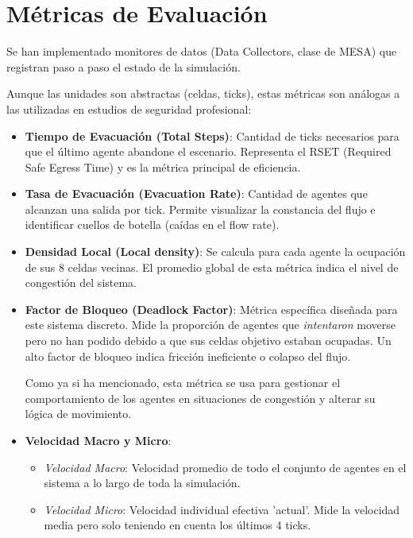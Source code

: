 \documentclass[11pt,spanish,listoffigures,listoftables]{tfgetsinf}
\begin{document}
\section{Métricas de Evaluación}

Se han implementado monitores de datos (Data Collectors, clase de MESA) que registran paso a paso el estado de la simulación. 

Aunque las unidades son abstractas (celdas, ticks), estas métricas son análogas a las utilizadas en estudios de seguridad profesional:

\begin{itemize}
    \item \textbf{Tiempo de Evacuación (Total Steps)}: Cantidad de ticks necesarios para que el último agente abandone el escenario. Representa el RSET (Required Safe Egress Time) y es la métrica principal de eficiencia.
    \item \textbf{Tasa de Evacuación (Evacuation Rate)}: Cantidad de agentes que alcanzan una salida por tick. Permite visualizar la constancia del flujo e identificar cuellos de botella (caídas en el flow rate).
    \item \textbf{Densidad Local (Local density)}: Se calcula para cada agente la ocupación de sus 8 celdas vecinas. El promedio global de esta métrica indica el nivel de congestión del sistema.
    \item \textbf{Factor de Bloqueo (Deadlock Factor)}: Métrica específica diseñada para este sistema discreto. Mide la proporción de agentes que \textit{intentaron} moverse pero no han podido debido a que sus celdas objetivo estaban ocupadas. Un alto factor de bloqueo indica fricción ineficiente o colapso del flujo.
    
    Como ya si ha mencionado, esta métrica se usa para gestionar el comportamiento de los agentes en situaciones de congestión y alterar su lógica de movimiento.

    \item \textbf{Velocidad Macro y Micro}:
    \begin{itemize}
        \item \textit{Velocidad Macro}: Velocidad promedio de todo el conjunto de agentes en el sistema a lo largo de toda la simulación.
        \item \textit{Velocidad Micro}: Velocidad individual efectiva 'actual'. Mide la velocidad media pero solo teniendo en cuenta los últimos 4 ticks.
    \end{itemize}
\end{itemize}
\end{document}
